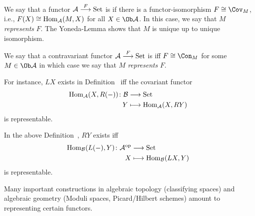 \documentclass[a4paper,parskip=half,numbers=enddot, DIV=12]{scrreprt}
\begin{document}
  \begin{defi}
  	\begin{alphanumerate}
  		\item We say that a functor $\Aa\morphism[F] \cat{Set}$ is  if there is a functor-isomorphism $F\cong \Cov_M$, i.e., $F(X) \cong \operatorname{Hom}_{\mathcal{A}}(M,X)$ for all $X\in\Ob\Aa$. In this case, we say that $M$ \emph{represents} $F$. The Yoneda-Lemma shows that $M$ is unique up to unique isomorphism.
  		\item We say that a contravariant functor $\Aa\morphism[F]\cat{Set}$ is  iff $F\cong \Con_M$ for some $M\in\Ob\Aa$ in which case we say that $M$ \emph{represents} $F$.
  	\end{alphanumerate}
  \end{defi}
  \begin{rem*}
  	\begin{alphanumerate}
  		\item  For instance, $LX$ exists in Definition~ iff the covariant functor 
  		\begin{align*}
  		\Hom_\Aa(X,R(-))\colon\Bb&\morphism\cat{Set}\\
  		Y &\longmapsto \Hom_\Aa(X, RY)
  		\end{align*}
  		is representable.
  		\item
  		In the above Definition~, $RY$ exists iff 
  		\begin{align*}
  		\Hom_\Bb(L(-), Y)\colon\Aa^\op&\morphism\cat{Set}\\
  		X&\longmapsto \Hom_\Bb(LX,Y)
  		\end{align*}
  		is representable.
  		\item 
  		Many important constructions in algebraic topology (classifying spaces) and algebraic geometry (Moduli spaces, Picard/Hilbert schemes) amount to representing certain functors.
  	\end{alphanumerate}
  \end{rem*}
\end{document}
